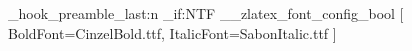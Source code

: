 

\zlatex_hook_preamble_last:n {
  \bool_if:NTF \g__zlatex_font_config_bool {
    \RequirePackage{fontspec}
    [
      BoldFont=CinzelBold.ttf,
      ItalicFont=SabonItalic.ttf
    ]
  }{\def\Cinzel{\relax}}
}



